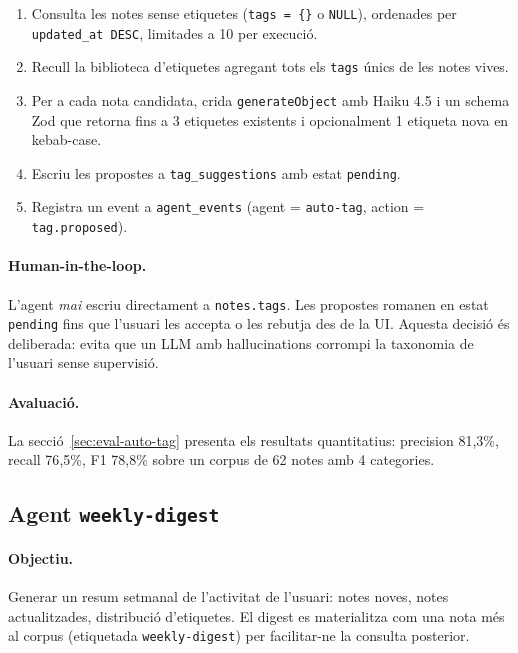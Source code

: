 \begin{enumerate}
    \item Consulta les notes sense etiquetes (\texttt{tags = \{\}} o \texttt{NULL}), ordenades per \texttt{updated\_at DESC}, limitades a 10 per execució.
    \item Recull la biblioteca d'etiquetes agregant tots els \texttt{tags} únics de les notes vives.
    \item Per a cada nota candidata, crida \texttt{generateObject} amb Haiku 4.5 i un schema Zod que retorna fins a 3 etiquetes existents i opcionalment 1 etiqueta nova en kebab-case.
    \item Escriu les propostes a \texttt{tag\_suggestions} amb estat \texttt{pending}.
    \item Registra un event a \texttt{agent\_events} (agent = \texttt{auto-tag}, action = \texttt{tag.proposed}).
\end{enumerate}

\paragraph{Human-in-the-loop.} L'agent \emph{mai} escriu directament a \texttt{notes.tags}. Les propostes romanen en estat \texttt{pending} fins que l'usuari les accepta o les rebutja des de la UI. Aquesta decisió és deliberada: evita que un LLM amb hallucinations corrompi la taxonomia de l'usuari sense supervisió.

\paragraph{Avaluació.} La secció~\ref{sec:eval-auto-tag} presenta els resultats quantitatius: precision 81{,}3\%, recall 76{,}5\%, F1 78{,}8\% sobre un corpus de 62 notes amb 4 categories.

\subsection{Agent \texttt{weekly-digest}}

\paragraph{Objectiu.} Generar un resum setmanal de l'activitat de l'usuari: notes noves, notes actualitzades, distribució d'etiquetes. El digest es materialitza com una nota més al corpus (etiquetada \texttt{weekly-digest}) per facilitar-ne la consulta posterior.

